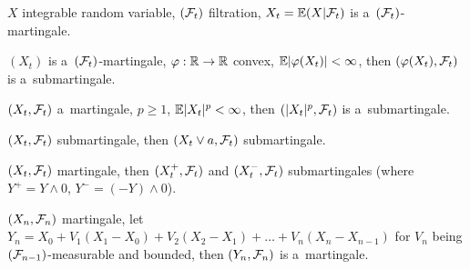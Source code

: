 	\begin{fact}
		$X$ integrable random variable, $(\mathcal{F}_t)$ filtration, $X_t = \mathbb{E}(X | \mathcal{F}_t)$ is a~$(\mathcal{F}_t)$-martingale.
	\end{fact}
	
	\begin{fact}
		$(X_t)$ is a~$(\mathcal{F}_t)$-martingale, $\varphi:\mathbb{R} \to \mathbb{R}$ convex, $\mathbb{E} |\varphi(X_t)| < \infty$, then $(\varphi(X_t), \mathcal{F}_t)$ is a~submartingale.
	\end{fact}
	
	\begin{corollary}
		$(X_t, \mathcal{F}_t)$ a~martingale, $p \geq 1$, $\mathbb{E} |X_t|^p < \infty$, then $(|X_t|^p, \mathcal{F}_t)$ is a~submartingale.
	\end{corollary}
	
	\begin{corollary}
		$(X_t, \mathcal{F}_t)$ submartingale, then $(X_t \vee a, \mathcal{F}_t)$ submartingale.
	\end{corollary}
	
	\begin{corollary}
		$(X_t, \mathcal{F}_t)$ martingale, then $(X_t^+, \mathcal{F}_t)$ and $(X_t^-, \mathcal{F}_t)$ submartingales (where $Y^+ = Y \wedge 0$, $Y^- = (-Y) \wedge 0$).
	\end{corollary}
	
	\begin{fact}
		$(X_n, \mathcal{F}_n)$ martingale, let $Y_n = X_0 + V_1(X_1 - X_0) + V_2 (X_2 - X_1) + \ldots + V_n (X_n - X_{n-1})$ for $V_n$ being $(\mathcal{F}_{n-1})$-measurable and bounded, then $(Y_n, \mathcal{F}_n)$ is a~martingale.
	\end{fact}









 
 
